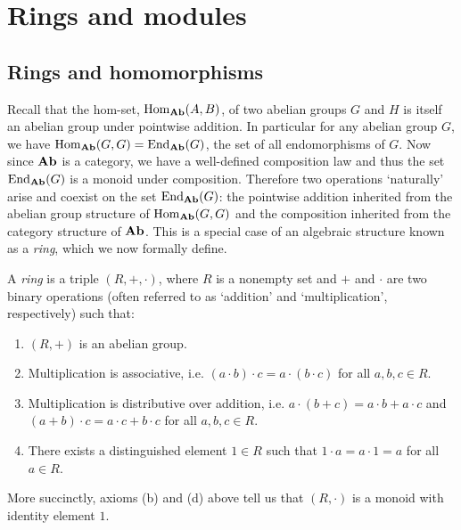 \chapter{Rings and modules}
\label{ch:rings}

\section{Rings and homomorphisms}

Recall that the hom-set, \(\operatorname{Hom}_{\mathbf{Ab}}(A, B)\), of two abelian groups \(G\) and
\(H\) is itself an abelian group under pointwise addition. In particular for any
abelian group \(G\), we have \(\operatorname{Hom}_{\mathbf{Ab}}(G, G) = \operatorname{End}_{\mathbf{Ab}}(G)\), the set of
all endomorphisms of \(G\). Now since \(\mathbf{Ab}\) is a category, we have a
well-defined composition law and thus the set \(\operatorname{End}_{\mathbf{Ab}}(G)\) is a monoid
under composition. Therefore two operations `naturally' arise and coexist on the
set \(\operatorname{End}_{\mathbf{Ab}}(G)\): the pointwise addition inherited from the abelian group
structure of \(\operatorname{Hom}_{\mathbf{Ab}}(G, G)\) and the composition inherited from the
category structure of \(\mathbf{Ab}\). This is a special case of an algebraic structure
known as a \emph{ring}, which we now formally define.

\begin{definition}
    A \emph{ring} is a triple \((R, +, \cdot)\), where \(R\) is a nonempty set
    and \(+\) and \(\cdot\) are two binary operations (often referred to as
    `addition' and `multiplication', respectively) such that:
    \begin{enumerate}[label=(\alph*)]
        \item \((R, +)\) is an abelian group.
        \item Multiplication is associative, i.e. \((a \cdot b) \cdot c = a
        \cdot (b \cdot c)\) for all \(a, b, c \in R\).
        \item Multiplication is distributive over addition, i.e. \(a \cdot (b +
        c) = a \cdot b + a \cdot c\) and \((a + b) \cdot c = a \cdot c + b \cdot
        c\) for all \(a, b, c \in R\).
        \item There exists a distinguished element \(1 \in R\) such that \(1
        \cdot a = a \cdot 1 = a\) for all \(a \in R\).
    \end{enumerate}
\end{definition}

More succinctly, axioms (b) and (d) above tell us that \((R, \cdot)\) is a
monoid with identity element \(1\).

